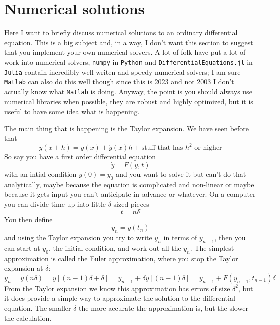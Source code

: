 \documentclass[12pt]{article}
\begin{document}
\section*{Numerical solutions}

Here I want to briefly discuss numerical solutions to an ordinary
differential equation. This is a big subject and, in a way, I don't
want this section to suggest that you implement your own numerical
solvers. A lot of folk have put a lot of work into numerical solvers,
\texttt{numpy} in \texttt{Python} and
\texttt{DifferentialEquations.jl} in \texttt{Julia} contain incredibly
well writen and speedy numerical solvers; I am sure \texttt{Matlab}
can also do this well though since this is 2023 and not 2003 I don't
actually know what \texttt{Matlab} is doing. Anyway, the point is you
should always use numerical libraries when possible, they are robust
and highly optimized, but it is useful to have some idea what is
happening.

The main thing that is happening is the Taylor expansion. We have seen before that
\begin{equation}
  y(x+h)=y(x)+\dot{y}(x)h+\mbox{stuff that has }h^2\mbox{ or higher}
\end{equation}
So say you have a first order differential equation
\begin{equation}
  \dot{y}=F(y,t)
\end{equation}
with an intial condition $y(0)=y_0$ and you want to solve it but can't
do that analytically, maybe because the equation is complicated and
non-linear or maybe because it gets input you can't anticipate in
advance or whatever. On a computer you can divide time up into little
$\delta$ sized pieces
\begin{equation}
  t=n\delta
\end{equation}
You then define
\begin{equation}
  y_n=y(t_n)
\end{equation}
and using the Taylor expansion you try to write $y_n$ in terms of
$y_{n-1}$, then you can start at $y_0$, the initial condition, and
work out all the $y_n$. The simplest approximation is called the Euler approximation, where you stop the Taylor expansion at $\delta$:
\begin{equation}
  y_n=y(n\delta)=y[(n-1)\delta+\delta]=y_{n-1}+\delta \dot{y}[(n-1)\delta]=y_{n-1}+F(y_{n-1},t_{n-1})\delta
\end{equation}
From the Taylor expansion we know this approximation has errors of
size $\delta^2$, but it does provide a simple way to approximate the
solution to the differential equation. The smaller $\delta$ the more
accurate the approximation is, but the slower the calculation.
\end{document}
